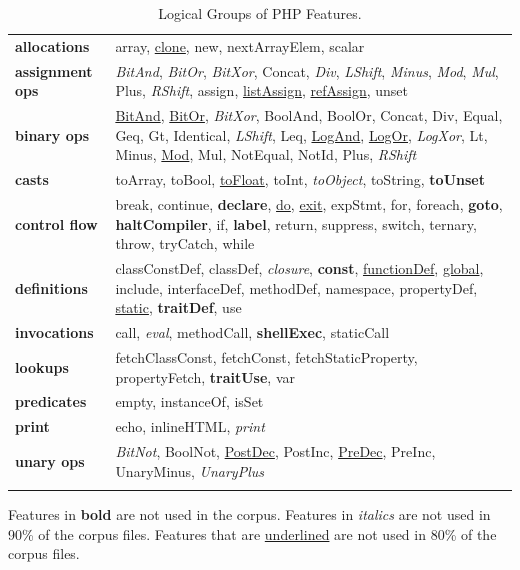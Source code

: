 \documentclass[main.tex]{subfiles}
\begin{document}
\begin{table}
\begin{tabularx}{\columnwidth}{lX}
\textbf{allocations} & array, \underline{clone}, new, nextArrayElem, scalar \\
\textbf{assignment ops} & \textit{BitAnd}, \textit{BitOr}, \textit{BitXor}, Concat, \textit{Div}, \textit{LShift}, \textit{Minus}, \textit{Mod}, \textit{Mul}, Plus, \textit{RShift}, assign, \underline{listAssign}, \underline{refAssign}, unset \\
\textbf{binary ops} & \underline{BitAnd}, \underline{BitOr}, \textit{BitXor}, BoolAnd, BoolOr, Concat, Div, Equal, Geq, Gt, Identical, \textit{LShift}, Leq, \underline{LogAnd}, \underline{LogOr}, \textit{LogXor}, Lt, Minus, \underline{Mod}, Mul, NotEqual, NotId, Plus, \textit{RShift} \\
\textbf{casts} & toArray, toBool, \underline{toFloat}, toInt, \textit{toObject}, toString, \textbf{toUnset} \\
\textbf{control flow} & break, continue, \textbf{declare}, \underline{do}, \underline{exit}, expStmt, for, foreach, \textbf{goto}, \textbf{haltCompiler}, if, \textbf{label}, return, suppress, switch, ternary, throw, tryCatch, while \\
\textbf{definitions} & classConstDef, classDef, \textit{closure}, \textbf{const}, \underline{functionDef}, \underline{global}, include, interfaceDef, methodDef, namespace, propertyDef, \underline{static}, \textbf{traitDef}, use \\
\textbf{invocations} & call, \textit{eval}, methodCall, \textbf{shellExec}, staticCall \\
\textbf{lookups} & fetchClassConst, fetchConst, fetchStaticProperty, propertyFetch, \textbf{traitUse}, var \\
\textbf{predicates} & empty, instanceOf, isSet \\
\textbf{print} & echo, inlineHTML, \textit{print} \\
\textbf{unary ops} & \textit{BitNot}, BoolNot, \underline{PostDec}, PostInc, \underline{PreDec}, PreInc, UnaryMinus, \textit{UnaryPlus} \\
 & \\ \end{tabularx}
\parbox{\columnwidth}{Features in \textbf{bold} are not used in the corpus. Features in \textit{italics} are not used in 90\% of the corpus files. Features that are \underline{underlined} are not used in 80\% of the corpus files.}
\ \vspace{1ex}
\caption{Logical Groups of PHP Features.\label{Table:FeatureGroups}}
\end{table}
\end{document}
